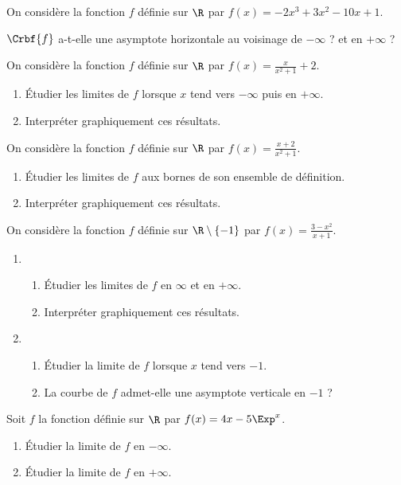 \begin{mth}
On considère la fonction $f$ définie sur $\R$ par $f(x)=-2x^3+3x^2-10x+1$.

$\Crbf{f}$ a-t-elle une asymptote horizontale au voisinage de $-\infty$ ? et en  $+\infty$ ?
\end{mth}
%
%
%
\begin{mth}
On considère la fonction $f$ définie sur $\R$ par $f(x)=\frac{x}{x^2+1}+2$.
    \begin{enumerate}
    \item \'Etudier les limites de $f$ lorsque $x$ tend vers $-\infty$ puis en $+\infty$.
    \item Interpréter graphiquement ces résultats.
    \end{enumerate}
\end{mth}
%
%
%
\begin{mth}
On considère la fonction $f$ définie sur $\R$ par $f(x)=\frac{x+2}{x^2+1}$.
    \begin{enumerate}
    \item \'Etudier les limites de $f$ aux bornes de son ensemble de définition.
    \item Interpréter graphiquement ces résultats.
    \end{enumerate}
\end{mth}
%
%
%
\begin{mth}
On considère la fonction $f$ définie sur $\R\setminus\{-1\}$ par $f(x)=\frac{3-x^2}{x+1}$.
    \begin{enumerate}
    \item 
        \begin{enumerate}
        \item \'Etudier les limites de $f$ en $\infty$ et en $+\infty$. 
        \item Interpréter graphiquement ces résultats.
        \end{enumerate}
    \item 
            \begin{enumerate}
        \item \'Etudier la limite de $f$ lorsque $x$ tend vers $-1$. 
        \item La courbe de $f$ admet-elle une asymptote verticale en $-1$ ?
        \end{enumerate}
    \end{enumerate}
\end{mth}
%
%
%
\begin{mth}Soit $f$ la fonction définie sur $\R$ par $f(x)=4x-5\Exp^{x}$.
	\begin{enumerate}
	\item \'Etudier la limite de $f$ en $-\infty$.
	\item \'Etudier la limite de $f$ en $+\infty$.
	\end{enumerate}
\end{mth}
